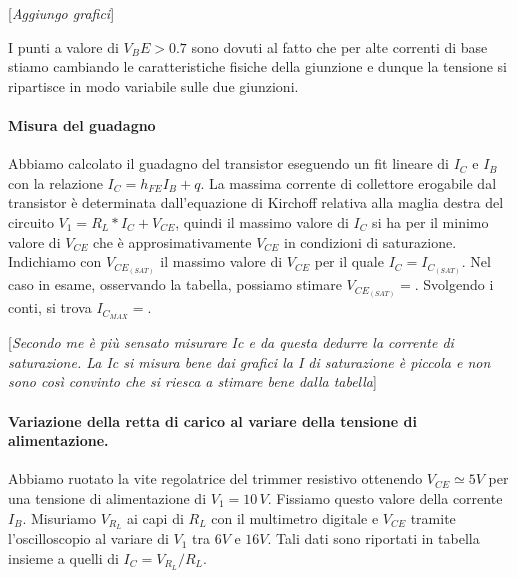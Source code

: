 \documentclass[10pt,a4paper]{article}
\newcommand{\rem}[1]{[\emph{#1}]}
\begin{document}
\rem{Aggiungo grafici}

I punti a valore di $V_{B}E > 0.7$ sono dovuti al fatto che per alte correnti di base stiamo cambiando le caratteristiche fisiche della giunzione e dunque la tensione si ripartisce in modo variabile sulle due giunzioni.
 
\paragraph{Misura del guadagno}
Abbiamo calcolato il guadagno del transistor  eseguendo un fit lineare di $I_C$ e $I_B$ con la  relazione $I_C=h_{FE}I_B+q$.
La massima corrente di collettore erogabile dal transistor è determinata dall'equazione di Kirchoff relativa alla maglia destra del circuito  $V_1 = R_L*I_C + V_{CE}$, quindi il massimo valore di $I_C$ si ha per il minimo valore di $V_{CE}$ che è  approsimativamente $V_{CE}$ in condizioni di saturazione.
  Indichiamo con $V_ {CE_{(SAT)}}$  il massimo valore di $V_{CE}$ per il quale $I_C = I_{C_{(SAT)}}$. Nel caso in esame, osservando la tabella, possiamo  stimare $V_{CE_{(SAT)}}=$. Svolgendo i conti, si trova $I_{C_{MAX}} = $. 
 
 \rem{Secondo me è più sensato misurare Ic e da questa dedurre la corrente di saturazione. La Ic si misura bene dai grafici la I di saturazione è piccola e non sono così convinto che si riesca a stimare bene dalla tabella}
 
\paragraph{Variazione della retta di carico al variare della tensione di alimentazione.}
 
Abbiamo ruotato la vite regolatrice del trimmer resistivo ottenendo $V_{CE}\simeq 5V$ per una tensione di alimentazione di $V_1 = 10 \, V$. Fissiamo questo valore della corrente $I_B$. Misuriamo  $V_{R_L}$ ai capi di $R_L$ con il multimetro digitale  e $V_{CE}$ tramite l'oscilloscopio al variare di $V_1$ tra $6 V$ e $16 V$. Tali dati sono riportati in tabella insieme a quelli di $I_C=V_{R_L}/R_L$.

\end{document}
